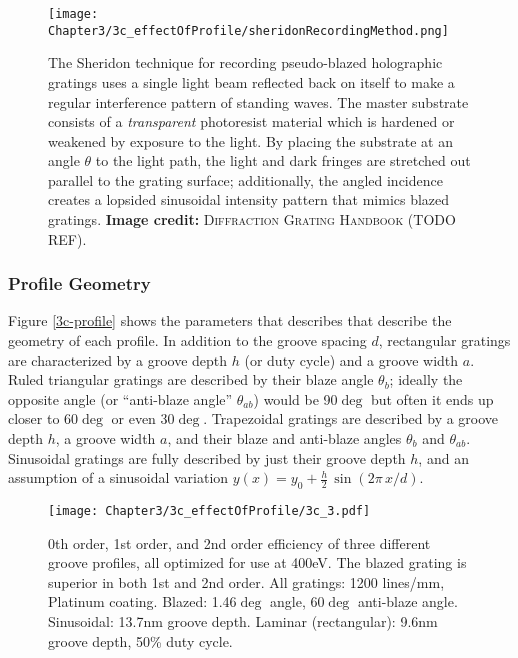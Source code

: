\begin{figure}[htbp] %
   \centering
   \texttt{[image: Chapter3/3c\_effectOfProfile/sheridonRecordingMethod.png]}
   \caption{The Sheridon technique for recording pseudo-blazed holographic gratings uses a single light beam reflected back on itself to make a regular interference pattern of standing waves.  The master substrate consists of a \emph{transparent} photoresist material which is hardened or weakened by exposure to the light.  By placing the substrate at an angle $\theta$ to the light path, the light and dark fringes are stretched out parallel to the grating surface; additionally, the angled incidence creates a lopsided sinusoidal intensity pattern that mimics blazed gratings. \textbf{Image credit: }\textsc{Diffraction Grating Handbook} (TODO REF).}
   \label{3c-sheridon}
\end{figure}


\subsubsection{Profile Geometry}
Figure \ref{3c-profile} shows the parameters that describes that describe the geometry of each profile.  In addition to the groove spacing $d$, rectangular gratings are characterized by a groove depth $h$ (or duty cycle) and a groove width $a$.  Ruled triangular gratings are described by their blaze angle $\theta_b$; ideally the opposite angle (or ``anti-blaze angle'' $\theta_{ab}$) would be 90$\deg$ but often it ends up closer to 60$\deg$ or even 30$\deg$.  Trapezoidal gratings are described by a groove depth $h$, a groove width $a$, and their blaze and anti-blaze angles $\theta_b$ and $\theta_{ab}$.  Sinusoidal gratings are fully described by just their groove depth $h$, and an assumption of a sinusoidal variation $y(x) = y_0 + \frac{h}{2}\, \sin(2\pi \,x / d)$.

     
\begin{figure}[htbp] %
   \centering
   \texttt{[image: Chapter3/3c\_effectOfProfile/3c\_3.pdf]} 
   \caption{0th order, 1st order, and 2nd order efficiency of three different groove profiles, all optimized for use at 400eV.  The blazed grating is superior in both 1st and 2nd order.  All gratings: 1200 lines/mm, Platinum coating.  Blazed: 1.46$\deg$ angle, 60$\deg$ anti-blaze angle.  Sinusoidal: 13.7nm groove depth.  Laminar (rectangular): 9.6nm groove depth, 50\% duty cycle. }
   \label{3c-plot}
\end{figure}

